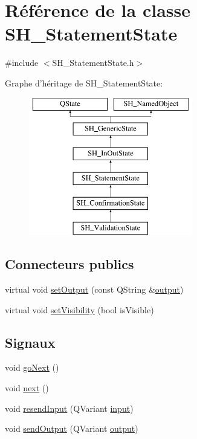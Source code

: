 \hypertarget{classSH__StatementState}{\section{Référence de la classe S\-H\-\_\-\-Statement\-State}
\label{classSH__StatementState}
}


{\ttfamily \#include $<$S\-H\-\_\-\-Statement\-State.\-h$>$}

Graphe d'héritage de S\-H\-\_\-\-Statement\-State\-:\begin{figure}[H]
\begin{center}
\leavevmode
\includegraphics[height=6.000000cm]{classSH__StatementState}
\end{center}
\end{figure}
\subsection*{Connecteurs publics}
\begin{DoxyCompactItemize}
\item 
virtual void \hyperlink{classSH__InOutState_af611c84134e262739cd834797b315c80}{set\-Output} (const Q\-String \&\hyperlink{classSH__InOutState_a17ed7eaf5e3ed5af80a4f9fe65d5bfd9}{output})
\item 
virtual void \hyperlink{classSH__InOutState_a7fdfaa6f600f0ac4a96f238a038ba9ad}{set\-Visibility} (bool is\-Visible)
\end{DoxyCompactItemize}
\subsection*{Signaux}
\begin{DoxyCompactItemize}
\item 
void \hyperlink{classSH__GenericState_a34c1bebc765cc3a62d66c94c37d4f0c3}{go\-Next} ()
\item 
void \hyperlink{classSH__GenericState_ad5e2a1f3dc129336c8f529cf897c2eb0}{next} ()
\item 
void \hyperlink{classSH__InOutState_a1f00480afefd173002cf56d4c4128048}{resend\-Input} (Q\-Variant \hyperlink{classSH__InOutState_a8e1b78069343122df7713624a1a5a100}{input})
\item 
void \hyperlink{classSH__InOutState_a77921c5f42059bc97361f4ff7827da12}{send\-Output} (Q\-Variant \hyperlink{classSH__InOutState_a17ed7eaf5e3ed5af80a4f9fe65d5bfd9}{output})
\end{DoxyCompactItemize}
